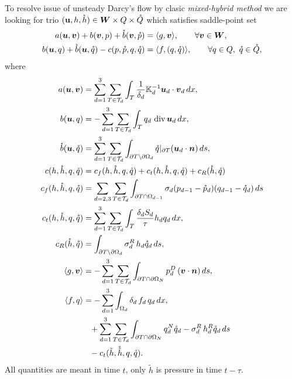 To resolve issue of unsteady Darcy's flow by clasic 
\emph{mixed-hybrid method} we are looking for trio $(\mathbf{u},h,\mathring h)  
\in \mathbf{\boldsymbol{W}}\times Q\times\mathring Q$ which satisfies saddle-point set
\begin{align}
    a(\vc u,\vc v)  +b(\vc v, p) + \mr b(\vc v, \mr p)
        &=\langle g,\vc v \rangle, \qquad\forall \vc v\in \vc W,
        \label{eq:hybrid-frac-1}\\
    b(\vc u, q ) + \mr b( \vc u, \mr q) - c(p, \mr p, q, \mr q)
        &= \langle f, (q,\mr q) \rangle,
        \qquad\forall q\in Q,\ \mr q\in \mr Q, 
        \label{eq:hybrid-frac-2}
\end{align}
where
\begin{align}
    \label{eq:weak_term_a}
    a(\vc u, \vc v) &= \sum_{d=1}^{3}\sum_{T\in \mathcal T_d}
    \int_{T} \frac{1}{\delta_{d}}\tn K_{d}^{-1} 
    \vc u_d\cdot \vc v_d\,dx,
    \\
    \label{eq:weak_term_b}
    b(\vc u, q)  &= -\sum_{d=1}^{3}\sum_{T\in \mathcal T_d}
    \int_{T} q_d\,\div \vc u_d\,dx,
    \\
    \label{eq:weak_term_bf}
    \mr b(\vc u, \mr q)   &= \sum_{d=1}^{3}\sum_{T\in \mathcal T_d}
    \int_{\partial T\setminus\partial\Omega_{d}}
        \mr q|_{\partial T} ( \vc u_d\cdot\vc n)\,ds,
    \\
    \label{eq:weak_term c}
    c(h, \mr h, q, \mr q) &= c_f(h, \mr h, q, \mr q) 
    + c_t(h, \mr h, q, \mr q) + c_R(\mr h, \mr q)
    \\
    c_f(h, \mr h, q, \mr q)&=\sum_{d=2,3}\sum_{T\in \mathcal T_d}
        \int_{\partial T \cap\Omega_{d-1}} \sigma_{d} 
        (p_{d-1} - \mr p_d)(q_{d-1} - \mr q_d)\,ds
    \\
    c_t(h, \mr h, q, \mr q)&= \sum_{d=1}^{3}\sum_{T\in \mathcal T_d}
        \int_{T} \frac{\delta_d S_d}{\tau} h_d q_d\,dx,
    \\    
    c_R(\mr h, \mr q)&=
    \int_{\partial T\setminus\partial\Omega_{d}}
        \sigma_d^R\, h_d \mr q_d \,ds,
    \\
    \langle g, \vc v \rangle  & =
    -\sum_{d=1}^{3}\sum_{T\in\mathcal T_d}
    \int_{\partial T\cap\partial\Omega_N} 
        p_d^D\, (\vc v \cdot \vc n)  \,ds,
    \\
    \langle f, q \rangle  &=
    -\sum_{d=1}^{3}\int_{\Omega_d} \delta_{d}\,f_d\,q_{d}\,dx,
    \\
        &\phantom{=}+
    \sum_{d=1}^{3}\sum_{T\in\mathcal T_d}
    \int_{\partial T\cap\partial\Omega_N} 
        q_d^N \mr q_d - \sigma_d^R\, h_d^R \mr q_d\,ds
    \\
        &\phantom{=}-c_t(\tilde h, \mr{\tilde{h}}, q, \mr q).
    \label{eq:weak_term_f}%
\end{align}
All quantities are meant in time $t$, only $\tilde h$ is pressure in time $t-\tau$.

